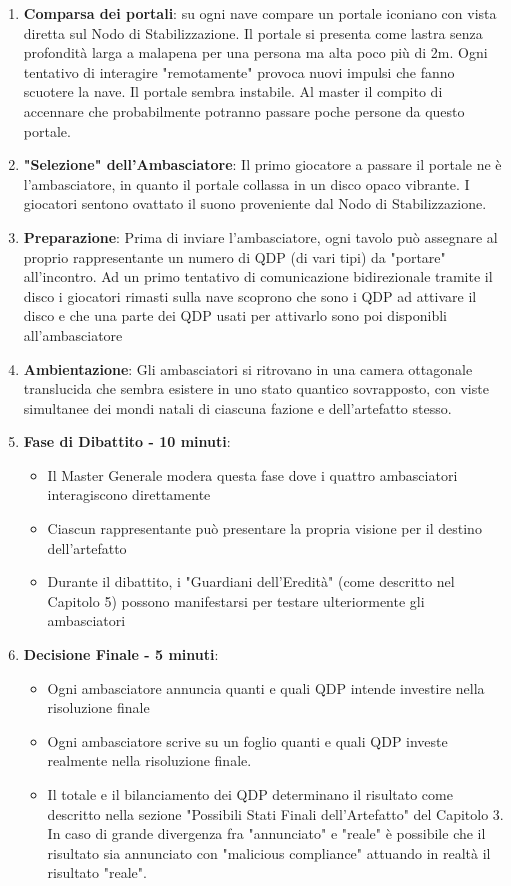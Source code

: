 \documentclass[letterpaper,twocolumn,openany,nodeprecatedcode]{dndbook}
\begin{document}
\begin{enumerate}
    \item \textbf{Comparsa dei portali}: su ogni nave compare un portale iconiano con vista diretta sul Nodo di Stabilizzazione. Il portale si presenta come lastra senza profondità larga a malapena per una persona ma alta poco più di 2m. Ogni tentativo di interagire "remotamente" provoca nuovi impulsi che fanno scuotere la nave. Il portale sembra instabile. Al master il compito di accennare che probabilmente potranno passare poche persone da questo portale. 
    \item \textbf{"Selezione" dell'Ambasciatore}: Il primo giocatore a passare il portale ne è l'ambasciatore, in quanto il portale collassa in un disco opaco vibrante. I giocatori sentono ovattato il suono proveniente dal Nodo di Stabilizzazione. 
    \item \textbf{Preparazione}: Prima di inviare l'ambasciatore, ogni tavolo può assegnare al proprio rappresentante un numero di QDP (di vari tipi) da "portare" all'incontro. Ad un primo tentativo di comunicazione bidirezionale tramite il disco i giocatori rimasti sulla nave scoprono che sono i QDP ad attivare il disco e che una parte dei QDP usati per attivarlo sono poi disponibli all'ambasciatore
    \item \textbf{Ambientazione}: Gli ambasciatori si ritrovano in una camera ottagonale translucida che sembra esistere in uno stato quantico sovrapposto, con viste simultanee dei mondi natali di ciascuna fazione e dell'artefatto stesso.
    \item \textbf{Fase di Dibattito - 10 minuti}:
    \begin{itemize}
    \item Il Master Generale modera questa fase dove i quattro ambasciatori interagiscono direttamente
    \item Ciascun rappresentante può presentare la propria visione per il destino dell'artefatto
    \item Durante il dibattito, i "Guardiani dell'Eredità" (come descritto nel Capitolo 5) possono manifestarsi per testare ulteriormente gli ambasciatori
    \end{itemize}
    \item \textbf{Decisione Finale - 5 minuti}:
    \begin{itemize}
    \item Ogni ambasciatore annuncia quanti e quali QDP intende investire nella risoluzione finale
    \item Ogni ambasciatore scrive su un foglio quanti e quali QDP investe realmente nella risoluzione finale.
    \item Il totale e il bilanciamento dei QDP determinano il risultato come descritto nella sezione "Possibili Stati Finali dell'Artefatto" del Capitolo 3. In caso di grande divergenza fra "annunciato" e "reale" è possibile che il risultato sia annunciato con "malicious compliance" attuando in realtà il risultato "reale".
    \end{itemize}
\end{enumerate}
\end{document}
